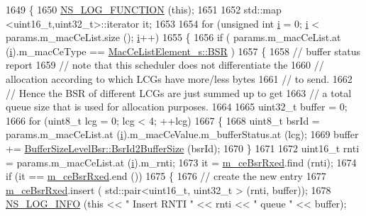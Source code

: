 \begin{DoxyCode}
1649 \{
1650   \hyperlink{log-macros-disabled_8h_a90b90d5bad1f39cb1b64923ea94c0761}{NS\_LOG\_FUNCTION} (\textcolor{keyword}{this});
1651 
1652   std::map <uint16\_t,uint32\_t>::iterator it;
1653 
1654   \textcolor{keywordflow}{for} (\textcolor{keywordtype}{unsigned} \textcolor{keywordtype}{int} \hyperlink{bernuolliDistribution_8m_a6f6ccfcf58b31cb6412107d9d5281426}{i} = 0; \hyperlink{bernuolliDistribution_8m_a6f6ccfcf58b31cb6412107d9d5281426}{i} < params.m\_macCeList.size (); \hyperlink{bernuolliDistribution_8m_a6f6ccfcf58b31cb6412107d9d5281426}{i}++)
1655     \{
1656       \textcolor{keywordflow}{if} ( params.m\_macCeList.at (\hyperlink{bernuolliDistribution_8m_a6f6ccfcf58b31cb6412107d9d5281426}{i}).m\_macCeType == \hyperlink{structns3_1_1MacCeListElement__s_a270a6526dfc7da02e9dc91823c290f6bac50796b01160b1825ec34efa1ad9f051}{MacCeListElement\_s::BSR} )
1657         \{
1658           \textcolor{comment}{// buffer status report}
1659           \textcolor{comment}{// note that this scheduler does not differentiate the}
1660           \textcolor{comment}{// allocation according to which LCGs have more/less bytes}
1661           \textcolor{comment}{// to send.}
1662           \textcolor{comment}{// Hence the BSR of different LCGs are just summed up to get}
1663           \textcolor{comment}{// a total queue size that is used for allocation purposes.}
1664 
1665           uint32\_t buffer = 0;
1666           \textcolor{keywordflow}{for} (uint8\_t lcg = 0; lcg < 4; ++lcg)
1667             \{
1668               uint8\_t bsrId = params.m\_macCeList.at (\hyperlink{bernuolliDistribution_8m_a6f6ccfcf58b31cb6412107d9d5281426}{i}).m\_macCeValue.m\_bufferStatus.at (lcg);
1669               buffer += \hyperlink{classns3_1_1BufferSizeLevelBsr_a67fc905f267ed8ac5a617fe229699122}{BufferSizeLevelBsr::BsrId2BufferSize} (bsrId);
1670             \}
1671 
1672           uint16\_t rnti = params.m\_macCeList.at (\hyperlink{bernuolliDistribution_8m_a6f6ccfcf58b31cb6412107d9d5281426}{i}).m\_rnti;
1673           it = \hyperlink{classns3_1_1RrFfMacScheduler_a1696bc07e1fdc0336106223f97b44298}{m\_ceBsrRxed}.find (rnti);
1674           \textcolor{keywordflow}{if} (it == \hyperlink{classns3_1_1RrFfMacScheduler_a1696bc07e1fdc0336106223f97b44298}{m\_ceBsrRxed}.end ())
1675             \{
1676               \textcolor{comment}{// create the new entry}
1677               \hyperlink{classns3_1_1RrFfMacScheduler_a1696bc07e1fdc0336106223f97b44298}{m\_ceBsrRxed}.insert ( std::pair<uint16\_t, uint32\_t > (rnti, buffer));
1678               \hyperlink{group__logging_gafbd73ee2cf9f26b319f49086d8e860fb}{NS\_LOG\_INFO} (\textcolor{keyword}{this} << \textcolor{stringliteral}{" Insert RNTI "} << rnti << \textcolor{stringliteral}{" queue "} << buffer);

\end{DoxyCode}
